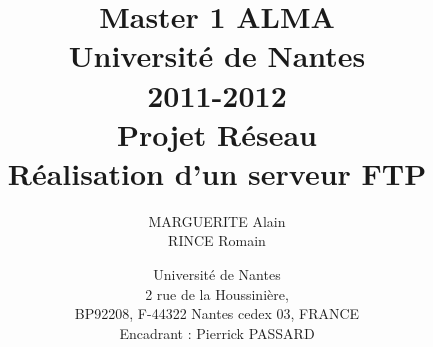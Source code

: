 \documentclass[12pt,a4paper,utf8x]{report}
\title
{
	\normalsize{Master 1 ALMA\\
	Université de Nantes\\
	2011-2012}\\
	\vspace{15mm}
	\Huge{Projet Réseau\\ Réalisation d'un serveur FTP  }
}
\author{MARGUERITE Alain\\RINCE Romain
	\vspace{45mm}
}
\date
{	
	\normalsize{Université de Nantes \\ 2 rue de la Houssinière,\\ BP92208, F-44322 Nantes cedex 03, FRANCE
	\\ 
	\vspace{5mm}	
	Encadrant : Pierrick PASSARD\\
	}
}
\begin{document}
\maketitle


\tableofcontents
\clearpage

\begin{onehalfspace}





\end{onehalfspace}


\printindex

\appendix
\end{document}
